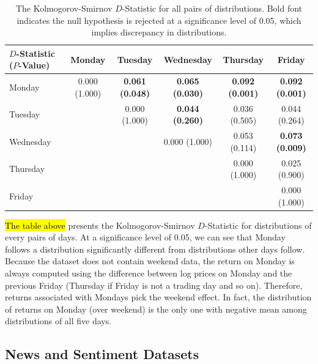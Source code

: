 \documentclass[12pt]{article}
\begin{document}
	\begin{table}[H]
		\small
		\centering
		\begin{tabular}{l|c|c|c|c|c}
			\toprule
			$D$-Statistic ($P$-Value)& Monday & Tuesday & Wednesday & Thursday & Friday \\
			\midrule
			Monday    & 0.000 (1.000) & \textbf{0.061 (0.048)} & \textbf{0.065 (0.030)} & \textbf{0.092 (0.001)} & \textbf{0.092 (0.001)} \\
			Tuesday   &               & 0.000 (1.000) & \textbf{0.044 (0.260)} & 0.036 (0.505) & 0.044 (0.264) \\
			Wednesday &               &               & 0.000 (1.000) & 0.053 (0.114) & \textbf{0.073 (0.009)} \\
			Thursday  &               &               &               & 0.000 (1.000) & 0.025 (0.900) \\
			Friday    &               &               &               &               & 0.000 (1.000) \\
			\bottomrule
		\end{tabular}
		\caption{The Kolmogorov-Smirnov $D$-Statistic for all pairs of distributions. Bold font indicates the null hypothesis is rejected at a significance level of 0.05, which implies discrepancy in distributions.}
	\end{table}
	\hl{The table above} presents the Kolmogorov-Smirnov $D$-Statistic for distributions of every pairs of days. At a significance level of 0.05, we can see that Monday follows a distribution significantly different from distributions other days follow. Because the dataset does not contain weekend data, the return on Monday is always computed using the difference between log prices on Monday and the previous Friday (Thursday if Friday is not a trading day and so on). Therefore, returns associated with Mondays pick the weekend effect. In fact, the distribution of returns on Monday (over weekend) is the only one with negative mean among distributions of all five days.

	\subsection{News and Sentiment Datasets}
\end{document}
